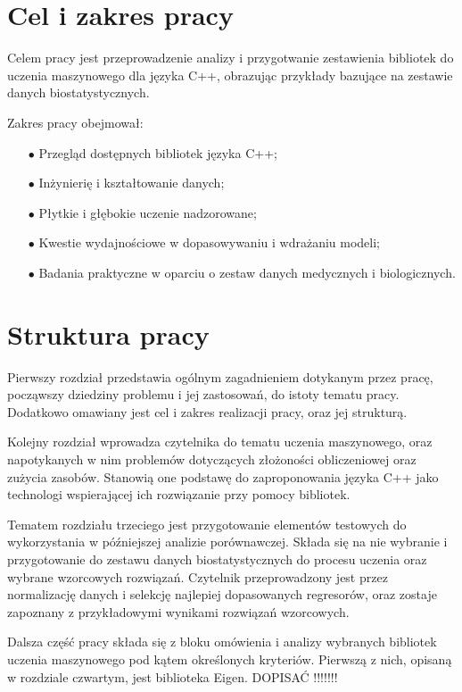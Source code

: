 \section{Cel i zakres pracy} %

Celem pracy jest przeprowadzenie analizy i przygotwanie zestawienia bibliotek do uczenia maszynowego dla języka C++, obrazując przykłady bazujące na zestawie danych biostatystycznych.

Zakres pracy obejmował:

\begin{itemize}
    \item [$\bullet$] Przegląd dostępnych bibliotek języka C++;
    \item [$\bullet$] Inżynierię i kształtowanie danych;
    \item [$\bullet$] Płytkie i głębokie uczenie nadzorowane;
    \item [$\bullet$] Kwestie wydajnościowe w dopasowywaniu i wdrażaniu modeli;
    \item [$\bullet$] Badania praktyczne w oparciu o zestaw danych medycznych i biologicznych.
\end{itemize}

\section{Struktura pracy} %

Pierwszy rozdział przedstawia ogólnym zagadnieniem dotykanym przez pracę, począwszy dziedziny problemu i jej zastosowań, do istoty tematu pracy. Dodatkowo omawiany jest cel i zakres realizacji pracy, oraz jej strukturą.

Kolejny rozdział wprowadza czytelnika do tematu uczenia maszynowego, oraz napotykanych w nim problemów dotyczących złożoności obliczeniowej oraz zużycia zasobów. Stanowią one podstawę do zaproponowania języka C++ jako technologi wspierającej ich rozwiązanie przy pomocy bibliotek. 

Tematem rozdziału trzeciego jest przygotowanie elementów testowych do wykorzystania w późniejszej analizie porównawczej. Składa się na nie wybranie i przygotowanie do zestawu danych biostatystycznych do procesu uczenia oraz wybrane wzorcowych rozwiązań. Czytelnik przeprowadzony jest przez normalizację danych i selekcję najlepiej dopasowanych regresorów, oraz zostaje zapoznany z przykładowymi wynikami rozwiązań wzorcowych.

Dalsza część pracy składa się z bloku omówienia i analizy wybranych bibliotek uczenia maszynowego pod kątem określonych kryteriów. Pierwszą z nich, opisaną w rozdziale czwartym, jest biblioteka Eigen. DOPISAĆ !!!!!!!
